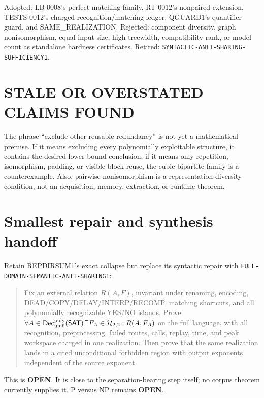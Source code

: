 \documentclass[11pt]{article}
\newcommand{\SAT}{\mathsf{SAT}}
\newcommand{\Htwo}{\mathcal H_{2,2}}
\newcommand{\OPEN}{\textbf{OPEN}}
\begin{document}
Adopted: LB-0008's perfect-matching family, RT-0012's nonpaired extension,
TESTS-0012's charged recognition/matching ledger, QGUARD1's quantifier guard,
and SAME\_REALIZATION.  Rejected: component diversity, graph nonisomorphism,
equal input size, high treewidth, compatibility rank, or model count as
standalone hardness certificates.  Retired:
\texttt{SYNTACTIC-ANTI-SHARING-SUFFICIENCY1}.

\section{STALE OR OVERSTATED CLAIMS FOUND}

The phrase ``exclude other reusable redundancy'' is not yet a mathematical
premise.  If it means excluding every polynomially exploitable structure, it
contains the desired lower-bound conclusion; if it means only repetition,
isomorphism, padding, or visible block reuse, the cubic-bipartite family is a
counterexample.  Also, pairwise nonisomorphism is a representation-diversity
condition, not an acquisition, memory, extraction, or runtime theorem.

\section{Smallest repair and synthesis handoff}

Retain REPDIRSUM1's exact collapse but replace its syntactic repair with
\texttt{FULL-DOMAIN-SEMANTIC-ANTI-SHARING1}:
\begin{quote}
Fix an external relation \(R(A,F)\), invariant under renaming, encoding,
DEAD/COPY/DELAY/INTERP/RECOMP, matching shortcuts, and all polynomially
recognizable YES/NO islands.  Prove
\(
\forall A\in\operatorname{Dec}_{\rm unif}^{\rm poly}(\SAT)\,
\exists F_A\in\Htwo:R(A,F_A)
\)
on the full language, with all recognition, preprocessing, failed routes,
calls, replay, time, and peak workspace charged in one realization.  Then
prove that the same realization lands in a cited unconditional forbidden
region with output exponents independent of the source exponent.
\end{quote}
This is \OPEN.  It is close to the separation-bearing step itself; no corpus
theorem currently supplies it.  P versus NP remains \OPEN.
\end{document}

